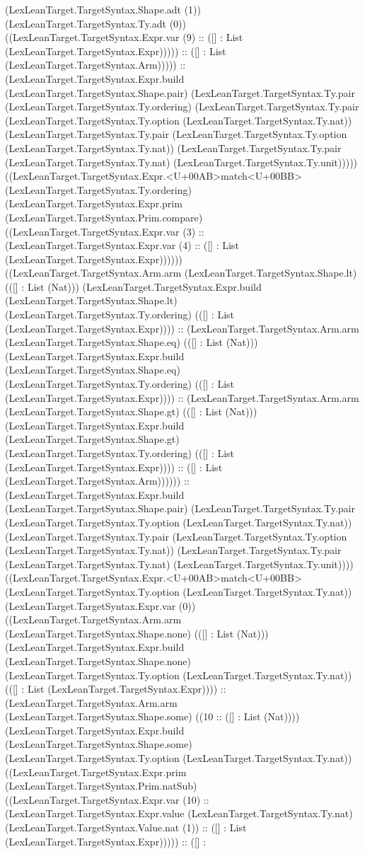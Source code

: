\documentclass[11pt]{article}
\begin{document}
(LexLeanTarget.TargetSyntax.Shape.adt (1)) (LexLeanTarget.TargetSyntax.Ty.adt (0)) ((LexLeanTarget.TargetSyntax.Expr.var (9) :: ([] : List (LexLeanTarget.TargetSyntax.Expr))))) :: ([] : List (LexLeanTarget.TargetSyntax.Arm))))) :: (LexLeanTarget.TargetSyntax.Expr.build (LexLeanTarget.TargetSyntax.Shape.pair) (LexLeanTarget.TargetSyntax.Ty.pair (LexLeanTarget.TargetSyntax.Ty.ordering) (LexLeanTarget.TargetSyntax.Ty.pair (LexLeanTarget.TargetSyntax.Ty.option (LexLeanTarget.TargetSyntax.Ty.nat)) (LexLeanTarget.TargetSyntax.Ty.pair (LexLeanTarget.TargetSyntax.Ty.option (LexLeanTarget.TargetSyntax.Ty.nat)) (LexLeanTarget.TargetSyntax.Ty.pair (LexLeanTarget.TargetSyntax.Ty.nat) (LexLeanTarget.TargetSyntax.Ty.unit))))) ((LexLeanTarget.TargetSyntax.Expr.<U+00AB>match<U+00BB> (LexLeanTarget.TargetSyntax.Ty.ordering) (LexLeanTarget.TargetSyntax.Expr.prim (LexLeanTarget.TargetSyntax.Prim.compare) ((LexLeanTarget.TargetSyntax.Expr.var (3) :: (LexLeanTarget.TargetSyntax.Expr.var (4) :: ([] : List (LexLeanTarget.TargetSyntax.Expr)))))) ((LexLeanTarget.TargetSyntax.Arm.arm (LexLeanTarget.TargetSyntax.Shape.lt) (([] : List (Nat))) (LexLeanTarget.TargetSyntax.Expr.build (LexLeanTarget.TargetSyntax.Shape.lt) (LexLeanTarget.TargetSyntax.Ty.ordering) (([] : List (LexLeanTarget.TargetSyntax.Expr)))) :: (LexLeanTarget.TargetSyntax.Arm.arm (LexLeanTarget.TargetSyntax.Shape.eq) (([] : List (Nat))) (LexLeanTarget.TargetSyntax.Expr.build (LexLeanTarget.TargetSyntax.Shape.eq) (LexLeanTarget.TargetSyntax.Ty.ordering) (([] : List (LexLeanTarget.TargetSyntax.Expr)))) :: (LexLeanTarget.TargetSyntax.Arm.arm (LexLeanTarget.TargetSyntax.Shape.gt) (([] : List (Nat))) (LexLeanTarget.TargetSyntax.Expr.build (LexLeanTarget.TargetSyntax.Shape.gt) (LexLeanTarget.TargetSyntax.Ty.ordering) (([] : List (LexLeanTarget.TargetSyntax.Expr)))) :: ([] : List (LexLeanTarget.TargetSyntax.Arm)))))) :: (LexLeanTarget.TargetSyntax.Expr.build (LexLeanTarget.TargetSyntax.Shape.pair) (LexLeanTarget.TargetSyntax.Ty.pair (LexLeanTarget.TargetSyntax.Ty.option (LexLeanTarget.TargetSyntax.Ty.nat)) (LexLeanTarget.TargetSyntax.Ty.pair (LexLeanTarget.TargetSyntax.Ty.option (LexLeanTarget.TargetSyntax.Ty.nat)) (LexLeanTarget.TargetSyntax.Ty.pair (LexLeanTarget.TargetSyntax.Ty.nat) (LexLeanTarget.TargetSyntax.Ty.unit)))) ((LexLeanTarget.TargetSyntax.Expr.<U+00AB>match<U+00BB> (LexLeanTarget.TargetSyntax.Ty.option (LexLeanTarget.TargetSyntax.Ty.nat)) (LexLeanTarget.TargetSyntax.Expr.var (0)) ((LexLeanTarget.TargetSyntax.Arm.arm (LexLeanTarget.TargetSyntax.Shape.none) (([] : List (Nat))) (LexLeanTarget.TargetSyntax.Expr.build (LexLeanTarget.TargetSyntax.Shape.none) (LexLeanTarget.TargetSyntax.Ty.option (LexLeanTarget.TargetSyntax.Ty.nat)) (([] : List (LexLeanTarget.TargetSyntax.Expr)))) :: (LexLeanTarget.TargetSyntax.Arm.arm (LexLeanTarget.TargetSyntax.Shape.some) ((10 :: ([] : List (Nat)))) (LexLeanTarget.TargetSyntax.Expr.build (LexLeanTarget.TargetSyntax.Shape.some) (LexLeanTarget.TargetSyntax.Ty.option (LexLeanTarget.TargetSyntax.Ty.nat)) ((LexLeanTarget.TargetSyntax.Expr.prim (LexLeanTarget.TargetSyntax.Prim.natSub) ((LexLeanTarget.TargetSyntax.Expr.var (10) :: (LexLeanTarget.TargetSyntax.Expr.value (LexLeanTarget.TargetSyntax.Ty.nat) (LexLeanTarget.TargetSyntax.Value.nat (1)) :: ([] : List (LexLeanTarget.TargetSyntax.Expr))))) :: ([] : 
\end{document}
